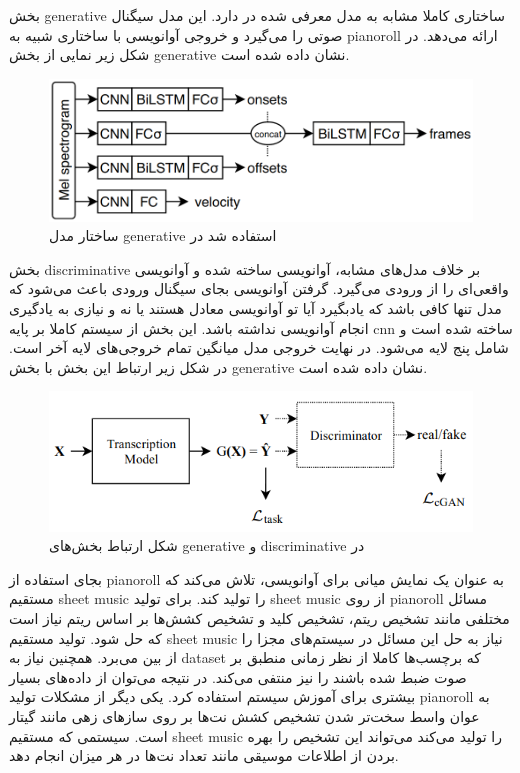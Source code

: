 بخش \gls{generative} ساختاری کاملا مشابه به مدل معرفی شده در
\cite{hawthorne2018enabling} دارد. این مدل سیگنال صوتی را می‌گیرد و خروجی
آوانویسی با ساختاری شبیه به \gls{pianoroll} ارائه می‌دهد. در شکل زیر نمایی از
بخش \gls{generative} نشان داده شده است.
\begin{figure}[ht]
    \centering
    \includegraphics[width=12cm]{./statics/kim2019adversarial_generative_architecture.png}
    \caption{ساختار مدل \gls{generative} استفاده شد در \cite{kim2019adversarial}}
\end{figure}

بخش \gls{discriminative} بر خلاف مدل‌های مشابه، آوانویسی ساخته شده و آوانویسی
واقعی‌ای را از ورودی می‌گیرد. گرفتن آوانویسی بجای سیگنال ورودی باعث می‌شود که
مدل تنها کافی باشد که یادبگیرد آیا تو آوانویسی معادل هستند یا نه و نیازی به
یادگیری انجام آوانویسی نداشته باشد. این بخش از سیستم کاملا بر پایه \gls{cnn}
ساخته شده است و شامل پنج لایه می‌شود. در نهایت خروجی مدل میانگین تمام خروجی‌های
لایه آخر است. در شکل زیر ارتباط این بخش با بخش \gls{generative} نشان داده شده
است.
\begin{figure}[ht]
    \centering
    \includegraphics[width=12cm]{./statics/kim2019adversarial_architecture.png}
    \caption{شکل ارتباط بخش‌های \gls{generative} و \gls{discriminative} در \cite{kim2019adversarial}}
\end{figure}

\cite{roman2018end} بجای استفاده از \gls{pianoroll} به عنوان یک نمایش میانی برای
آوانویسی، تلاش می‌کند که مستقیم \gls{sheet music} را تولید کند. برای تولید
\gls{sheet music} از روی \gls{pianoroll} مسائل مختلفی مانند تشخیص ریتم، تشخیص
کلید و تشخیص کشش‌ها بر اساس ریتم نیاز است که حل شود. تولید مستقیم \gls{sheet
music} نیاز به حل این مسائل در سیستم‌های مجزا را از بین می‌برد. همچنین نیاز به
\gls{dataset} که برچسب‌ها کاملا از نظر زمانی منطبق بر صوت ضبط شده باشند را نیز
منتفی می‌کند. در نتیجه می‌توان از داده‌های بسیار بیشتری برای آموزش سیستم استفاده
کرد. یکی دیگر از مشکلات تولید \gls{pianoroll} به عوان واسط سخت‌تر شدن تشخیص کشش
نت‌ها بر روی سازهای زهی مانند گیتار است. سیستمی که مستقیم \gls{sheet music} را
تولید می‌کند می‌تواند این تشخیص را بهره بردن از اطلاعات موسیقی مانند تعداد نت‌ها
در هر میزان انجام دهد.

